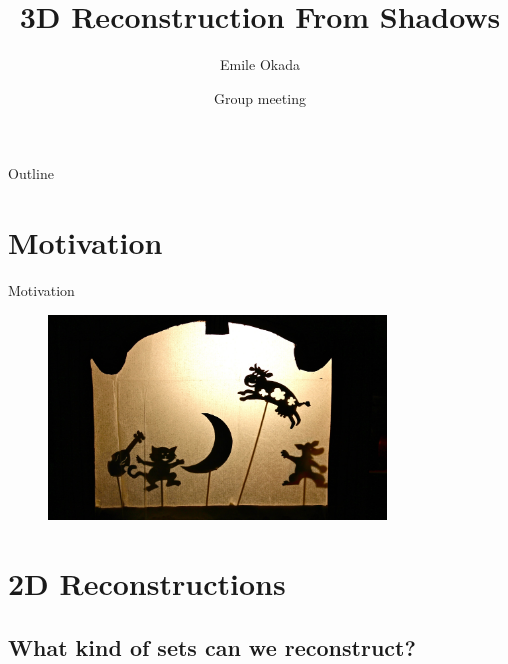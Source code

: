 \documentclass{beamer}
\title{3D Reconstruction From Shadows}
\author{Emile Okada\inst{1}}
\institute[University of Cambridge] %
{
  \inst{1}%
  DAMTP\\
  University of Cambridge
  }
\date{Group meeting}
\begin{document}
\begin{frame}
  \titlepage
\end{frame}

\begin{frame}{Outline}
  \tableofcontents
\end{frame}

\section{Motivation}

\begin{frame}{Motivation}
    \begin{figure}[H]
      \centering
        \includegraphics[width=0.8\textwidth]{puppets.jpg}
      \label{fig:f2}
    \end{figure}
\end{frame}

\section{2D Reconstructions}

\subsection{What kind of sets can we reconstruct?}
\end{document}
